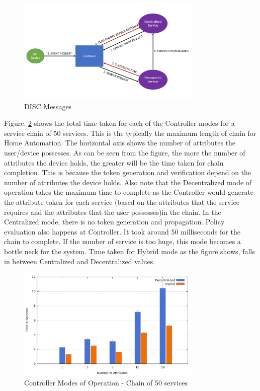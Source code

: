 \documentclass[journal]{IEEEtran}
\begin{document}
\begin{figure}[htbp]
\centerline{\includegraphics[width=3.5in]{messages.png}}
\caption{DISC Messages}
\label{fig:message_model}
\end{figure}
	
Figure. \ref{fig:cont_home} shows the total time taken for each of the Controller modes for a service chain of 50 services. This is the typically the maximum length of chain for Home Automation. The horizontal axis shows the number of attributes the user/device possesses. As can be seen from the figure, the more the number of attributes the device holds, the greater will be the time taken for chain completion. This is because the token generation and verification depend on the number of attributes the device holds. Also note that the Decentralized mode of operation takes the maximum time to complete as the Controller would generate the attribute token for each service (based on the attributes that the service requires and the attributes that the user possesses)in the chain. In the Centralized mode, there is no token generation and propagation. Policy evaluation also happens at Controller. It took around 50 milliseconds for the chain to complete. If the number of service is too huge, this mode becomes a bottle neck for the system. Time taken for Hybrid mode as the figure shows, falls in between Centralized and Decentralized values.

\begin{figure}[htbp]
\centerline{\includegraphics[width=3.5in]{100services.pdf}}
\caption{Controller Modes of Operation - Chain of 50 services}
\label{fig:cont_home}
\end{figure}
\end{document}
